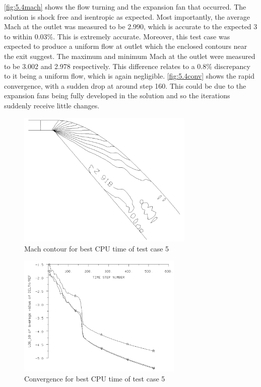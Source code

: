 \documentclass[12pt, a4paper]{article}
\begin{document}
\autoref{fig:5.4mach} shows the flow turning and the expansion fan that occurred. The solution is shock free and isentropic as expected. Most importantly, the average Mach at the outlet was measured to be 2.990, which is accurate to the expected 3 to within 0.03\%. This is extremely accurate. Moreover, this test case was expected to produce a uniform flow at outlet which the enclosed contours near the exit suggest. The maximum and minimum Mach at the outlet were measured to be 3.002 and 2.978 respectively. This difference relates to a 0.8\% discrepancy to it being a uniform flow, which is again negligible. \autoref{fig:5.4conv} shows the rapid convergence, with a sudden drop at around step 160. This could be due to the expansion fans being fully developed in the solution and so the iterations suddenly receive little changes.
\begin{figure}[H]
	\centering
	\includegraphics[width=0.75\textwidth]{plots/5.4 mach}
	\caption{Mach contour for  best CPU time of test case 5}
	\label{fig:5.4mach}
\end{figure}
\begin{figure}[H]
	\centering
	\includegraphics[width=0.7\textwidth]{plots/5.4 conv}
	\caption{Convergence for  best CPU time of test case 5}
	\label{fig:5.4conv}
\end{figure}
\end{document}
